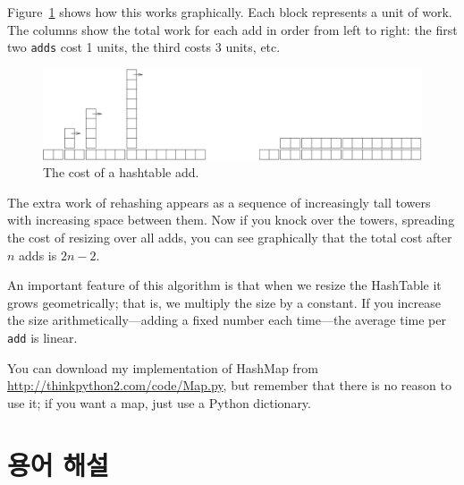 \documentclass[10pt]{book}
\begin{document}
Figure~\ref{fig.hash} shows how this works graphically.  Each
block represents a unit of work.  The columns show the total
work for each add in order from left to right: the first two
{\tt adds} cost 1 units, the third costs 3 units, etc.

\begin{figure}
\centerline{\includegraphics[width=5.5in]{figs/towers.pdf}}
\caption{The cost of a hashtable add.\label{fig.hash}}
\end{figure}

The extra work of rehashing appears as a sequence of increasingly
tall towers with increasing space between them.  Now if you knock
over the towers, spreading the cost of resizing over all
adds, you can see graphically that the total cost after $n$
adds is $2n - 2$.

An important feature of this algorithm is that when we resize the
HashTable it grows geometrically; that is, we multiply the size by a
constant.  If you increase the size
arithmetically---adding a fixed number each time---the average time
per {\tt add} is linear.

You can download my implementation of HashMap from
\url{http://thinkpython2.com/code/Map.py}, but remember that there
is no reason to use it; if you want a map, just use a Python dictionary.

\section{용어 해설}
\end{document}
